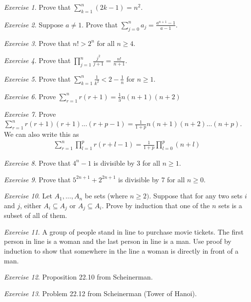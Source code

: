 \documentclass[11pt]{article}
\theoremstyle{plain}
\theoremstyle{definition}
\theoremstyle{remark}
\newtheorem{exc}{Exercise}[section]
\begin{document}
\begin{exc}
    Prove that $\sum_{k=1}^n (2k-1) = n^2$.
\end{exc}
\begin{exc}
    Suppose $a \neq 1$. Prove that $\sum_{j=0}^n a_j = \frac{a^{n+1} - 1}{a-1}$.
\end{exc}
\begin{exc}
    Prove that $n! > 2^n$ for all $n \geq 4$.
\end{exc}
\begin{exc}
    Prove that $\prod_{j=1}^n \frac{j^2}{j+1} = \frac{n!}{n+1}$.
\end{exc}
\begin{exc}
    Prove that $\sum_{k=1}^n \frac{1}{k^2} < 2 - \frac{1}{n}$ for $n \geq 1$.
\end{exc}
\begin{exc}
    Prove $\sum_{r=1}^n r(r+1) = \frac{1}{3} n(n+1)(n+2)$
\end{exc}
\begin{exc}
    Prove $\sum_{r=1}^n r(r+1)(r+1)...(r+p-1) = \frac{1}{1+p} n(n+1)(n+2)...(n+p)$. We can also write this as
    \begin{align*}
        \sum_{r=1}^n \prod_{l=1}^p r(r+l-1) = \frac{1}{1+p} \prod_{l=0}^p (n+l)
    \end{align*}
\end{exc}
\begin{exc}
    Prove that $4^n - 1$ is divisible by 3 for all $n \geq 1$.
\end{exc}
\begin{exc}
    Prove that $5^{2n+1} + 2^{2n+1}$ is divisible by 7 for all $n \geq 0$.
\end{exc}
\begin{exc}
    Let $A_1, ..., A_n$ be sets (where $n \geq 2)$. Suppose that for any two sets $i$ and $j$, either $A_i \subseteq A_j$ or $A_j \subseteq A_i$. Prove by induction that one of the $n$ sets is a subset of all of them.
\end{exc}
\begin{exc}
    A group of people stand in line to purchase movie tickets. The first person in line is a woman and the last person in line is a man. Use proof by induction to show that somewhere in the line a woman is directly in front of a man.
\end{exc}
\begin{exc}
    Proposition 22.10 from Scheinerman.
\end{exc}
\begin{exc}
    Problem 22.12 from Scheinerman (Tower of Hanoi).
\end{exc}
\end{document}
